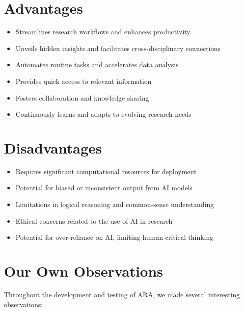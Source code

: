 \section*{Advantages}
\begin{itemize}
    \item Streamlines research workflows and enhances productivity
    \item Unveils hidden insights and facilitates cross-disciplinary connections
    \item Automates routine tasks and accelerates data analysis
    \item Provides quick access to relevant information
    \item Fosters collaboration and knowledge sharing
    \item Continuously learns and adapts to evolving research needs
\end{itemize}

\section*{Disadvantages}
\begin{itemize}
    \item Requires significant computational resources for deployment
    \item Potential for biased or inconsistent output from AI models
    \item Limitations in logical reasoning and common-sense understanding
    \item Ethical concerns related to the use of AI in research
    \item Potential for over-reliance on AI, limiting human critical thinking
\end{itemize}

\section*{Our Own Observations}
Throughout the development and testing of ARA, we made several interesting observations:

